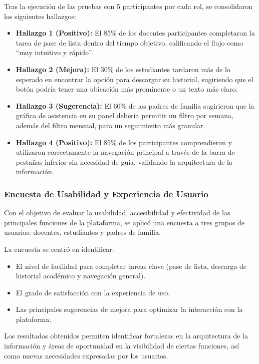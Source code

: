 Tras la ejecución de las pruebas con 5 participantes por cada rol, se consolidaron los siguientes hallazgos:

\begin{itemize}
    \item \textbf{Hallazgo 1 (Positivo):} El 85\% de los docentes participantes completaron la tarea de pase de lista dentro del tiempo objetivo, calificando el flujo como ``muy intuitivo y rápido''.
    \item \textbf{Hallazgo 2 (Mejora):} El 30\% de los estudiantes tardaron más de lo esperado en encontrar la opción para descargar su historial, sugiriendo que el botón podría tener una ubicación más prominente o un texto más claro.
    \item \textbf{Hallazgo 3 (Sugerencia):} El 60\% de los padres de familia sugirieron que la gráfica de asistencia en su panel debería permitir un filtro por semana, además del filtro mensual, para un seguimiento más granular.
    \item \textbf{Hallazgo 4 (Positivo):} El 85\% de los participantes comprendieron y utilizaron correctamente la navegación principal a través de la barra de pestañas inferior sin necesidad de guía, validando la arquitectura de la información.
\end{itemize}

\subsubsection*{Encuesta de Usabilidad y Experiencia de Usuario}

Con el objetivo de evaluar la usabilidad, accesibilidad y efectividad de las principales funciones de la plataforma, se aplicó una encuesta a tres grupos de usuarios: docentes, estudiantes y padres de familia.  

La encuesta se centró en identificar:
\begin{itemize}
    \item El nivel de facilidad para completar tareas clave (pase de lista, descarga de historial académico y navegación general).
    \item El grado de satisfacción con la experiencia de uso.
    \item Las principales sugerencias de mejora para optimizar la interacción con la plataforma.
\end{itemize}

Los resultados obtenidos permiten identificar fortalezas en la arquitectura de la información y áreas de oportunidad en la visibilidad de ciertas funciones, así como nuevas necesidades expresadas por los usuarios.



